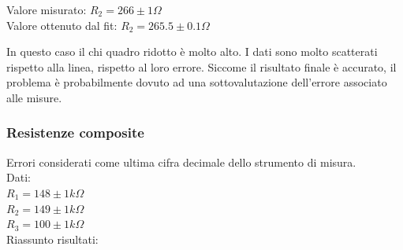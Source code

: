 %
    \begin{center}
    Valore misurato: $R_2 = 266 \pm 1  \Omega$  \\
    Valore ottenuto dal fit: $ R_2 = 265.5 \pm 0.1 \Omega$ \\
    \end{center}
%
    In questo caso il chi quadro ridotto è molto alto. I dati sono molto scatterati rispetto alla linea, rispetto al loro errore. Siccome il risultato finale è accurato, il problema è probabilmente dovuto ad una sottovalutazione dell'errore associato alle misure.
%
\subsubsection{Resistenze composite}
    Errori considerati come ultima cifra decimale dello strumento di misura.\\
%
    Dati:\\
       $ R_1 = 148 \pm 1 k\Omega $\\ 
       $ R_2 = 149 \pm 1 k\Omega $\\ 
       $ R_3 = 100 \pm 1 k\Omega $\\ 
%     
%
    
%  
    
    
    Riassunto risultati:
    
 
